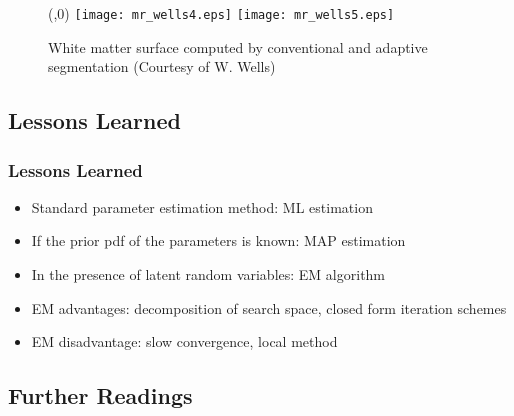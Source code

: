 \begin{figure}
  \centerline{\psscaleboxto(\linewidth,0){%
   \texttt{[image: mr\_wells4.eps]}
   \texttt{[image: mr\_wells5.eps]}
  }}
 \caption{White matter surface computed by conventional and
          adaptive segmentation (Courtesy of W. Wells)}\label{f:ii:struct}
\end{figure}
\fi


\subsection{Lessons Learned}

\begin{frame}
  \frametitle{Lessons Learned}

  \begin{itemize}
    \item Standard parameter estimation method: ML estimation \\[.5cm]
    \item If the prior pdf of the parameters is known: MAP estimation \\[.5cm]
    \item In the presence of latent random variables: EM algorithm \\[.5cm]
    \item EM advantages: decomposition of search space, closed form iteration schemes \\[.5cm]
    \item EM disadvantage: slow convergence, local method
  \end{itemize}
\end{frame}



\subsection{Further Readings}

